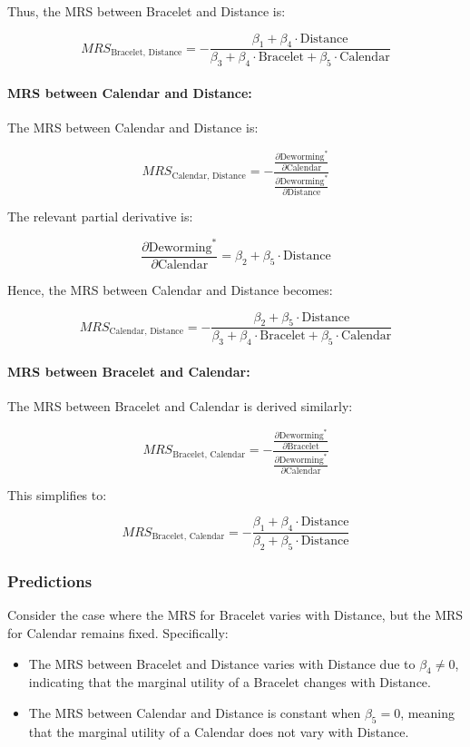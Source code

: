 \documentclass{article}
\begin{document}
Thus, the MRS between Bracelet and Distance is:

\[
MRS_{\text{Bracelet, Distance}} = -\frac{\beta_1 + \beta_4 \cdot \text{Distance}}{\beta_3 + \beta_4 \cdot \text{Bracelet} + \beta_5 \cdot \text{Calendar}}
\]

\paragraph{MRS between Calendar and Distance:}

The MRS between Calendar and Distance is:

\[
MRS_{\text{Calendar, Distance}} = -\frac{\frac{\partial \text{Deworming}^*}{\partial \text{Calendar}}}{\frac{\partial \text{Deworming}^*}{\partial \text{Distance}}}
\]

The relevant partial derivative is:

\[
\frac{\partial \text{Deworming}^*}{\partial \text{Calendar}} = \beta_2 + \beta_5 \cdot \text{Distance}
\]

Hence, the MRS between Calendar and Distance becomes:

\[
MRS_{\text{Calendar, Distance}} = -\frac{\beta_2 + \beta_5 \cdot \text{Distance}}{\beta_3 + \beta_4 \cdot \text{Bracelet} + \beta_5 \cdot \text{Calendar}}
\]

\paragraph{MRS between Bracelet and Calendar:}

The MRS between Bracelet and Calendar is derived similarly:

\[
MRS_{\text{Bracelet, Calendar}} = -\frac{\frac{\partial \text{Deworming}^*}{\partial \text{Bracelet}}}{\frac{\partial \text{Deworming}^*}{\partial \text{Calendar}}}
\]

This simplifies to:

\[
MRS_{\text{Bracelet, Calendar}} = -\frac{\beta_1 + \beta_4 \cdot \text{Distance}}{\beta_2 + \beta_5 \cdot \text{Distance}}
\]

\subsubsection*{Predictions}

Consider the case where the MRS for Bracelet varies with Distance, but the MRS for Calendar remains fixed. Specifically:

\begin{itemize}
    \item The MRS between Bracelet and Distance varies with Distance due to $\beta_4 \neq 0$, indicating that the marginal utility of a Bracelet changes with Distance.
    \item The MRS between Calendar and Distance is constant when $\beta_5 = 0$, meaning that the marginal utility of a Calendar does not vary with Distance.
\end{itemize}
\end{document}
